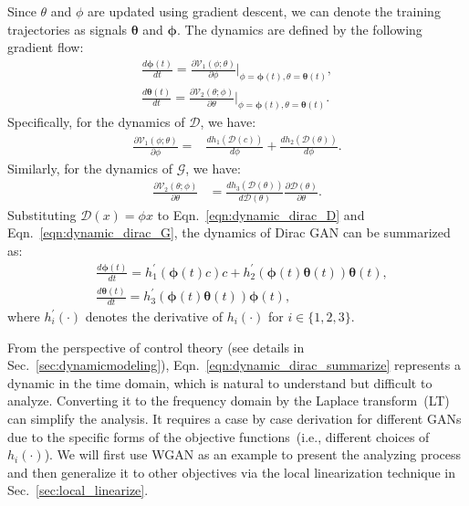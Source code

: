 \documentclass{article}
\newcommand{\xG}{\mathcal{G}}
\newcommand{\xD}{\mathcal{D}}
\newcommand{\uV}{\mathcal{V}}
\newcommand{\ttheta}{\bm{\theta}}
\newcommand{\tphi}{\bm{\phi}}
\newcommand{\eqn}[1]{Eqn.~\eqref{eqn:#1}}
\newcommand{\secref}[1]{Sec.~\ref{sec:#1}} \usepackage{wrapfig}
\theoremstyle{definition}
\begin{document}
Since $\theta$ and $\phi$ are updated using gradient descent, we can denote the training trajectories as signals $\ttheta$ and $\tphi$. The dynamics are defined by the following gradient flow:
\begin{align}
\frac{d\tphi(t)}{dt} = \frac{\partial \uV_1(\phi; \theta)}{\partial \phi}|_{\phi=\tphi(t),\theta=\ttheta(t)}, \nonumber\\
\frac{d\ttheta(t)}{dt} = \frac{\partial \uV_2(\theta; \phi)}{\partial \theta}|_{\phi=\tphi(t),\theta=\ttheta(t)}.
\end{align}
Specifically, for the dynamics of $\xD$, we have:
\begin{align}
\frac{\partial \uV_1(\phi; \theta)}{\partial \phi} = &\frac{d h_1(\xD(c))}{d\phi}+ \frac{d h_2(\xD(\theta)) }{d\phi} \label{eqn:dynamic_dirac_D}.
\end{align}
Similarly, for the dynamics of $\xG$, we have:
\begin{align}
\frac{\partial \uV_2(\theta;\phi)}{\partial \theta} &= \frac{d h_3(\xD(\theta))}{d \xD(\theta)}\frac{\partial \xD(\theta)}{\partial \theta} \label{eqn:dynamic_dirac_G}.
\end{align}
Substituting $\xD(x) = \phi x$ to \eqn{dynamic_dirac_D} and \eqn{dynamic_dirac_G}, the dynamics of Dirac GAN can be summarized as:
\begin{align}
& \frac{d\tphi(t)}{dt} = h_1^\prime(\tphi(t) c)c + h_2^\prime(\tphi(t) \ttheta(t))\ttheta(t), \nonumber\\
& \frac{d\ttheta(t)}{dt} = h_3^\prime(\tphi(t) \ttheta(t))\tphi(t), \label{eqn:dynamic_dirac_summarize}
\end{align}
where $h_i^\prime(\cdot)$ denotes the derivative of $h_i(\cdot)$ for $i\in\{1, 2, 3\}$.


From the perspective of control theory (see details in \secref{dynamicmodeling}), \eqn{dynamic_dirac_summarize} represents a dynamic in the time domain, which is natural to understand but difficult to analyze. Converting it to the frequency domain by the Laplace transform~(LT) can simplify the analysis. It requires a case by case derivation for different GANs due to the specific forms of the objective functions~(i.e., different choices of $h_i(\cdot)$).
We will first use WGAN as an example to present the analyzing process and then generalize it to other objectives via the local linearization technique in \secref{local_linearize}.
\end{document}
